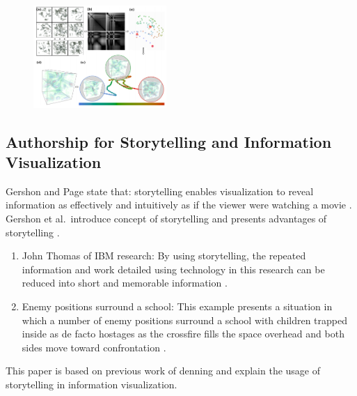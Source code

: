 \documentclass{egpubl}
\begin{document}
\begin{figure}
\includegraphics[width=0.45\textwidth]{./images/lu2008}
\label{lu2008}
\end{figure}


\subsection{Authorship for Storytelling and Information Visualization}
Gershon and Page state that: storytelling enables visualization to reveal information as effectively and intuitively as if the viewer were watching a movie \cite{Gershon2}. 
Gershon et al.\ introduce concept of storytelling and presents advantages of storytelling \cite{Gershon2}.
\begin{enumerate}
\item John Thomas of IBM research: By using storytelling, the repeated information and work detailed using technology in this research can be reduced into short and memorable information \cite{Thomas}.
\item Enemy positions surround a school: This example presents a situation in which a number of enemy positions surround a school with children trapped inside as de facto hostages as the crossfire fills the space overhead and both sides move toward confrontation \cite{denning}.
\end{enumerate}
This paper is based on previous work of denning \cite{denning} and explain the usage of storytelling in information visualization.
\end{document}
